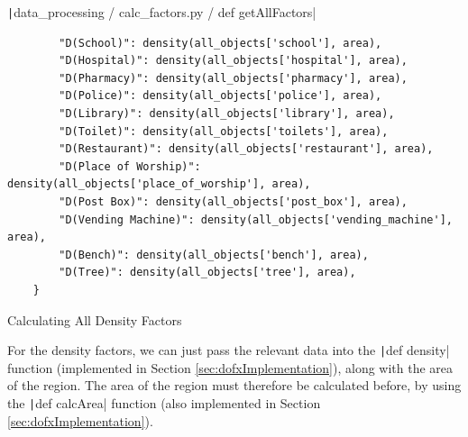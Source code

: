 \documentclass[12pt]{report}
\newcommand{\pil}[1]{\protect\texttt|#1|}
\begin{document}
\begin{listing}[H]
\pil{data_processing / calc_factors.py / def getAllFactors}
\begin{verbatim}
        "D(School)": density(all_objects['school'], area),
        "D(Hospital)": density(all_objects['hospital'], area),
        "D(Pharmacy)": density(all_objects['pharmacy'], area),
        "D(Police)": density(all_objects['police'], area),
        "D(Library)": density(all_objects['library'], area),
        "D(Toilet)": density(all_objects['toilets'], area),
        "D(Restaurant)": density(all_objects['restaurant'], area),
        "D(Place of Worship)": density(all_objects['place_of_worship'], area),
        "D(Post Box)": density(all_objects['post_box'], area),
        "D(Vending Machine)": density(all_objects['vending_machine'], area),
        "D(Bench)": density(all_objects['bench'], area),
        "D(Tree)": density(all_objects['tree'], area),
    }
\end{verbatim}
\caption{Calculating All Density Factors}\label{cs:calcAllDFactors}
\end{listing}

For the density factors, we can just pass the relevant data into the \pil{def density} function (implemented in Section \ref{sec:dofxImplementation}), along with the area of the region. The area of the region must therefore be calculated before, by using the \pil{def calcArea} function (also implemented in Section \ref{sec:dofxImplementation}).

\begin{center}
\end{center}
\end{document}
